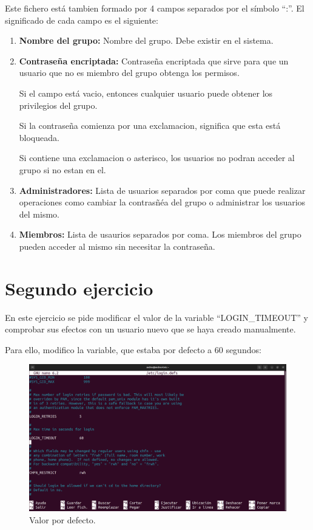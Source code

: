 \documentclass{article}
\begin{document}
Este fichero está tambien formado por 4 campos separados por el símbolo ``:''. El significado de cada campo es el siguiente:

\begin{enumerate}
    \item \textbf{Nombre del grupo: }Nombre del grupo. Debe existir en el sistema.
    \item \textbf{Contraseña encriptada: }Contraseña encriptada que sirve para que un usuario que no es miembro del grupo obtenga los permisos.
    
    Si el campo está vacio, entonces cualquier usuario puede obtener los privilegios del grupo.

    Si la contraseña comienza por una exclamacion, significa que esta está bloqueada.

    Si contiene una exclamacion o asterisco, los usuarios no podran acceder al grupo si no estan en el.

    \item \textbf{Administradores: }Lista de usuarios separados por coma que puede realizar operaciones como cambiar la contrasñéa del grupo o administrar los usuarios del mismo.
    \item \textbf{Miembros: }Lista de usaurios separados por coma. Los miembros del grupo pueden acceder al mismo sin necesitar la contraseña.
\end{enumerate}

\section{Segundo ejercicio}
En este ejercicio se pide modificar el valor de la variable ``LOGIN\_TIMEOUT'' y comprobar sus efectos con un usuario nuevo que se haya creado manualmente.

Para ello, modifico la variable, que estaba por defecto a 60 segundos:

\begin{figure}[H]
    \includegraphics[width=\textwidth]{imagenes/tout60.png}
    \caption{Valor por defecto.}
\end{figure}
\end{document}
